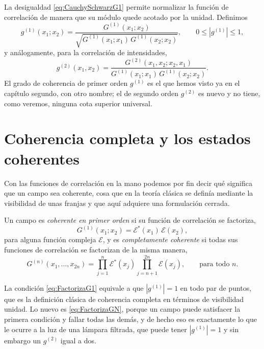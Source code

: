     La desigualdad \eqref{eq:CauchySchwarzG1} permite normalizar la función de correlación de manera que su módulo quede acotado por la unidad. Definimos
    \begin{equation}\label{eq:g1}
        g^{(1)}(x_{1};x_{2}) = \frac{G^{(1)}(x_{1};x_{2})}{\sqrt{G^{(1)}(x_{1};x_{1})\,G^{(1)}(x_{2};x_{2})}},
        \qquad
        0 \leq \left|g^{(1)}\right| \leq 1,
    \end{equation}
    y análogamente, para la correlación de intensidades,
    \begin{equation}\label{eq:g2}
        g^{(2)}(x_{1},x_{2}) = \frac{G^{(2)}(x_{1},x_{2};x_{2},x_{1})}{G^{(1)}(x_{1};x_{1})\,G^{(1)}(x_{2};x_{2})} .
    \end{equation}
    El grado de coherencia de primer orden $g^{(1)}$ es el que hemos visto ya en el capítulo segundo, con otro nombre; el de segundo orden $g^{(2)}$ es nuevo y no tiene, como veremos, ninguna cota superior universal.

\section{Coherencia completa y los estados coherentes}

    Con las funciones de correlación en la mano podemos por fin decir qué significa que un campo sea coherente, cosa que en la teoría clásica se definía mediante la visibilidad de unas franjas y que aquí adquiere una formulación cerrada.

    \begin{myDef}\label{def:CoherenciaGlauber}
        Un campo es \textit{coherente en primer orden} si su función de correlación se factoriza,
        \begin{equation}\label{eq:FactorizaG1}
            G^{(1)}(x_{1};x_{2}) = \mathcal{E}^{*}(x_{1})\,\mathcal{E}(x_{2}),
        \end{equation}
        para alguna función compleja $\mathcal{E}$, y es \textit{completamente coherente} si todas sus funciones de correlación se factorizan de la misma manera,
        \begin{equation}\label{eq:FactorizaGN}
            G^{(n)}\left(x_{1},\ldots,x_{2n}\right) = \prod_{j=1}^{n}\mathcal{E}^{*}(x_{j})\prod_{j=n+1}^{2n}\mathcal{E}(x_{j}),
            \qquad \text{para todo } n .
        \end{equation}
    \end{myDef}

    La condición \eqref{eq:FactorizaG1} equivale a que $|g^{(1)}|=1$ en todo par de puntos, que es la definición clásica de coherencia completa en términos de visibilidad unidad. Lo nuevo es \eqref{eq:FactorizaGN}, porque un campo puede satisfacer la primera condición y fallar todas las demás, y de hecho eso es exactamente lo que le ocurre a la luz de una lámpara filtrada, que puede tener $|g^{(1)}|=1$ y sin embargo un $g^{(2)}$ igual a dos.

